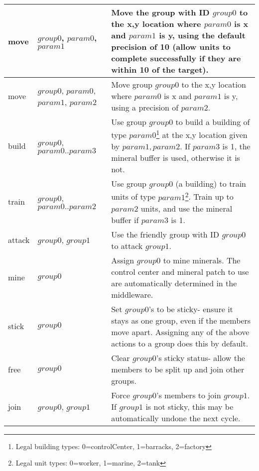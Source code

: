 \begin{center}
\begin{minipage}{6.5in}
\begin{tabular}{|l|p{1.0in}|p{3.5in}|}
\hline
move & $group0$, $param0$, $param1$ & Move the group with ID $group0$ to the x,y location where $param0$ is x and $param1$ is y, using the default precision of 10 (allow units to complete successfully if they are within 10 of the target).\\
\hline
move & $group0$, $param0$, $param1$, $param2$ & Move group $group0$ to the x,y location where $param0$ is x and $param1$ is y, using a precision of $param2$.\\
\hline
build & $group0$, $param0 .. param3$ & Use group $group0$ to build a building of type $param0$\footnote{Legal building types: 0=controlCenter, 1=barracks, 2=factory} at the x,y location given by $param1, param2$. If $param3$ is 1, the mineral buffer is used, otherwise it is not. \\
\hline
train & $group0$, $param0 .. param2$ & Use group $group0$ (a building) to train units of type $param1$\footnote{Legal unit types: 0=worker, 1=marine, 2=tank}. Train up to $param2$ units, and use the mineral buffer if $param3$ is 1. \\
\hline
attack & $group0$, $group1$ & Use the friendly group with ID $group0$ to attack $group1$.\\
\hline
mine & $group0$ & Assign $group0$ to mine minerals. The control center and mineral patch to use are automatically determined in the middleware. \\
\hline
stick & $group0$ & Set $group0$'s to be sticky- ensure it stays as one group, even if the members move apart. Assigning any of the above actions to a group does this by default. \\
\hline
free & $group0$ & Clear $group0$'s sticky status- allow the members to be split up and join other groups.\\
\hline
join &  $group0$, $group1$ & Force $group0$'s members to join $group1$. If $group1$ is not sticky, this may be automatically undone the next cycle.\\
\hline
\end{tabular}
\end{minipage}
\end{center}
